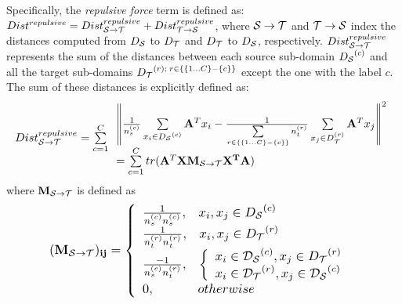 \documentclass[journal,twocolumn]{IEEEtran}
\begin{document}
\begin{CJK*}{UTF8}{gkai}
Specifically, the \textit{repulsive force} term is defined as: 
$Dis{t^{repulsive}} = Dist_{{\cal S} \to {\cal T}}^{repulsive} + Dist_{{\cal T} \to {\cal S}}^{repulsive}$, where ${{\cal S} \to {\cal T}}$ and ${{\cal T} \to {\cal S}}$ index the distances computed from ${D_{\cal S}}$ to ${D_{\cal T}}$ and ${D_{\cal T}}$ to ${D_{\cal S}}$, respectively. $Dist_{{\cal S} \to {\cal T}}^{repulsive}$ represents the sum of the distances between each source sub-domain ${D_{\cal S}}^{(c)}$ and all the  target sub-domains ${D_{\cal T}}^{(r);\;r \in \{ \{ 1...C\}  - \{ c\} \} }$ except the one with the label $c$. The sum of these distances is explicitly defined as:
		\begin{equation}\label{eq:StoT}
			\resizebox{1\hsize}{!}{%
				${Dist}_{{\cal S} \to {\cal T}}^{repulsive} = \sum\limits_{c = 1}^C \begin{array}{l}
				{\left\| {\frac{1}{{n_s^{(c)}}}\sum\limits_{{x_i} \in {D_{\cal S}}^{(c)}} {{{\bf{A}}^T}{x_i}}  - \frac{1}{{\sum\limits_{r \in \{ \{ 1...C\}  - \{ c\} \} } {n_t^{(r)}} }}\sum\limits_{{x_j} \in D_{\cal T}^{(r)}} {{{\bf{A}}^T}{x_j}} } \right\|^2}\\
				= \sum\limits_{c = 1}^C {tr({{\bf{A}}^T}{\bf{X}}{{\bf{M}}_{{\cal S} \to {\cal T}}}{{\bf{X}}^{\bf{T}}}{\bf{A}})} 
				\end{array} $}
		\end{equation}
where ${{\bf{M}}_{{\cal S} \to {\cal T}}}$ is defined as
\begin{equation}\label{eq:mstot}
		\resizebox{0.85\hsize}{!}{%
			$\begin{array}{c}
				(\bf M_{{{\cal S} \to {\cal T}}})_{ij} = \left\{ {\begin{array}{*{20}{l}}
						{\frac{1}{{n_s^{(c)}n_s^{(c)}}},\;\;\;{x_i},{x_j} \in {D_{\cal S}}^{(c)}}\\
						{\frac{1}{{n_t^{(r)}n_t^{(r)}}},\;\;\;{x_i},{x_j} \in {D_{\cal T}}^{(r)}}\\
						{\frac{{ - 1}}{{n_s^{(c)}n_t^{(r)}}},\;\;\;\left\{ {\begin{array}{*{20}{l}}
									{{x_i} \in {\cal D_{\cal S}}^{(c)},{x_j} \in {D_{\cal T}}^{(r)}}\\
									{{x_i} \in {\cal D_{\cal T}}^{(r)},{x_j} \in {\cal D_{\cal S}}^{(c)}}
								\end{array}} \right.}\\
							{0,\;\;\;\;\;\;\;\;\;\;\;\;otherwise}
						\end{array}} \right.
					\end{array}$}
				\end{equation}

\end{CJK*}
\end{document}
